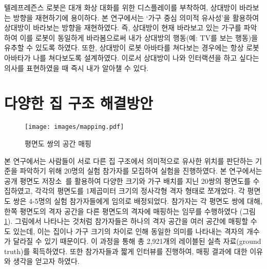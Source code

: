 텔레프레즌스 로봇은 대개 화상 대화를 위한 디스플레이를 부착하여, 상대방이 바라보는 방향을 재현하기에 용이하다. 본 연구에서는 `가구 중심 의미적 유사성'을 활용하여 상대방이 바라보는 방향을 재현하였다. 즉, 상대방이 현재 바라보고 있는 가구를 파악하여 이를 로봇이 동일하게 바라봄으로써 내가 상대방의 행동(예: TV를 보는 행동)을 유추할 수 있도록 하였다. 또한, 상대방이 로봇 아바타를 쳐다보는 경우에는 항상 로봇 아바타가 나를 쳐다보도록 설계하였다. 이로서 상대방이 나와 인터랙션을 하고 싶다는 의사를 표현하였을 때 즉시 내가 알아챌 수 있다.

\section{다양한 집 구조 해결방안}
\label{subsec:home_heterogeneity}


\begin{figure}
\centering
\texttt{[image: images/mapping.pdf]}
\caption{평면도 쌍의 공간 매핑}
\label{fig:mapping}
\end{figure}

본 연구에서는 사람들이 서로 다른 집 구조에서 의미적으로 유사한 위치를 판단하는 기준을 파악하기 위해 20명의 실험 참가자를 모집하여 실험을 진행하였다. 본 연구에서는 공개 평면도 저장소~\cite{floorplanner}를 활용하여 다양한 크기와 가구 배치를 지닌 20쌍의 평면도를 수집하였고, 각각의 평면도를 1제곱미터 크기의 정사각형 격자 형태로 쪼개었다. 각 평면도 쌍은 4-5명의 실험 참가자들에게 임의로 배정되었다. 참가자는 각 평면도 쌍에 대해, 한쪽 평면도의 격자 공간을 다른 평면도의 격자에 매핑하는 임무를 수행하였다 (그림 \ref{fig:mapping}). 그림에서 나타나는 것처럼 참가자들은 하나의 격자 공간을 여러 공간에 매핑할 수도 있는데, 이는 집이나 가구 크기의 차이로 인해 동일한 의미를 나타내는 격자의 개수가 달라질 수 있기 때문이다. 이 과정을 통해 총 2,921개의 레이블된 실측 자료(ground truth)를 획득하였다. 또한 참가자들과 짧게 인터뷰를 진행하여, 매핑 결과에 대한 이유와 생각을 얻고자 하였다.


